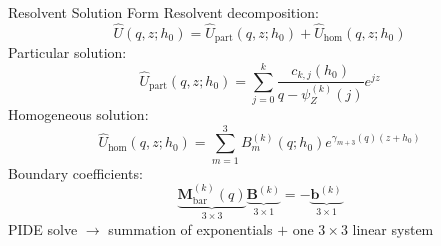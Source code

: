 \documentclass[aspectratio=169,10pt]{beamer}
\begin{document}
\begin{frame}{Resolvent Solution Form}
  \small
  Resolvent decomposition:
  \[
    \widehat U(q,z;h_0)
    =
    \widehat U_{\mathrm{part}}(q,z;h_0)
    +
    \widehat U_{\mathrm{hom}}(q,z;h_0)
  \]
  Particular solution:
  \[
    \widehat U_{\mathrm{part}}(q,z;h_0)
    =
    \sum_{j=0}^{k}
    \frac{c_{k,j}(h_0)}{q-\psi_Z^{(k)}(j)}e^{jz}
  \]
  Homogeneous solution:
  \[
    \widehat U_{\mathrm{hom}}(q,z;h_0)
    =
    \sum_{m=1}^{3}
    B_m^{(k)}(q;h_0)e^{\gamma_{m+3}(q)(z+h_0)}
  \]
  Boundary coefficients:
  \[
    \underbrace{\mathbf M_{\mathrm{bar}}^{(k)}(q)}_{3\times3}
    \underbrace{\mathbf B^{(k)}}_{3\times1}
    =
    -\underbrace{\mathbf b^{(k)}}_{3\times1}
  \]
  PIDE solve $\rightarrow$ summation of exponentials $+$ one $3\times3$ linear system
\end{frame}
\end{document}
